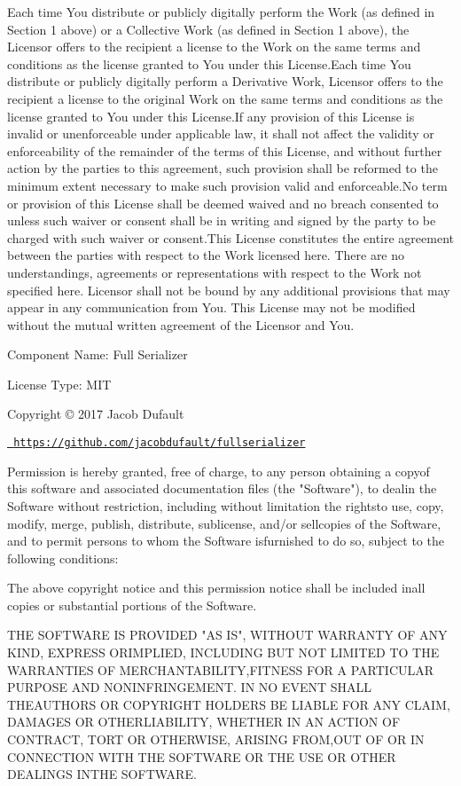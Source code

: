 Each time You distribute or publicly digitally perform the Work (as defined in Section 1 above) or a Collective Work (as defined in Section 1 above), the Licensor offers to the recipient a license to the Work on the same terms and conditions as the license granted to You under this License.\+Each time You distribute or publicly digitally perform a Derivative Work, Licensor offers to the recipient a license to the original Work on the same terms and conditions as the license granted to You under this License.\+If any provision of this License is invalid or unenforceable under applicable law, it shall not affect the validity or enforceability of the remainder of the terms of this License, and without further action by the parties to this agreement, such provision shall be reformed to the minimum extent necessary to make such provision valid and enforceable.\+No term or provision of this License shall be deemed waived and no breach consented to unless such waiver or consent shall be in writing and signed by the party to be charged with such waiver or consent.\+This License constitutes the entire agreement between the parties with respect to the Work licensed here. There are no understandings, agreements or representations with respect to the Work not specified here. Licensor shall not be bound by any additional provisions that may appear in any communication from You. This License may not be modified without the mutual written agreement of the Licensor and You.

 Component Name\+: Full Serializer

License Type\+: MIT

Copyright © 2017 Jacob Dufault

\href{https://github.com/jacobdufault/fullserializer}{\texttt{ https\+://github.\+com/jacobdufault/fullserializer}}

Permission is hereby granted, free of charge, to any person obtaining a copyof this software and associated documentation files (the "{}\+Software"{}), to dealin the Software without restriction, including without limitation the rightsto use, copy, modify, merge, publish, distribute, sublicense, and/or sellcopies of the Software, and to permit persons to whom the Software isfurnished to do so, subject to the following conditions\+:

The above copyright notice and this permission notice shall be included inall copies or substantial portions of the Software.

THE SOFTWARE IS PROVIDED "{}\+AS IS"{}, WITHOUT WARRANTY OF ANY KIND, EXPRESS ORIMPLIED, INCLUDING BUT NOT LIMITED TO THE WARRANTIES OF MERCHANTABILITY,FITNESS FOR A PARTICULAR PURPOSE AND NONINFRINGEMENT. IN NO EVENT SHALL THEAUTHORS OR COPYRIGHT HOLDERS BE LIABLE FOR ANY CLAIM, DAMAGES OR OTHERLIABILITY, WHETHER IN AN ACTION OF CONTRACT, TORT OR OTHERWISE, ARISING FROM,OUT OF OR IN CONNECTION WITH THE SOFTWARE OR THE USE OR OTHER DEALINGS INTHE SOFTWARE.

